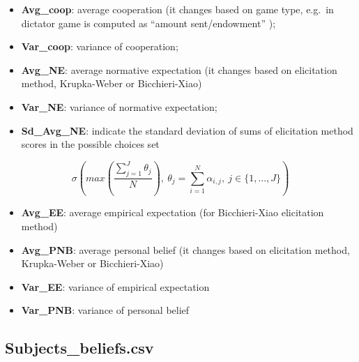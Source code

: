 \documentclass[
]{article}
\providecommand{\tightlist}{%
  \setlength{\itemsep}{0pt}\setlength{\parskip}{0pt}}
\begin{document}
\begin{itemize}
\tightlist
\item
  \textbf{Avg\_coop}: average cooperation (it changes based on game
  type, e.g.~in dictator game is computed as ``amount sent/endowment''
  );
\item
  \textbf{Var\_coop}: variance of cooperation;
\item
  \textbf{Avg\_NE}: average normative expectation (it changes based on
  elicitation method, Krupka-Weber or Bicchieri-Xiao)
\item
  \textbf{Var\_NE}: variance of normative expectation;
\item
  \textbf{Sd\_Avg\_NE}: indicate the standard deviation of sums of
  elicitation method scores in the possible choices set
\end{itemize}

\[\sigma\left(max\left( \frac{\sum_{j=1}^{J}\theta_j}{N} \right),\ \theta_j = \sum_{i=1}^{N}\alpha_{i,j}, \ j\in\{1,...,J\}\right)\]

\begin{itemize}
\tightlist
\item
  \textbf{Avg\_EE}: average empirical expectation (for Bicchieri-Xiao
  elicitation method)
\item
  \textbf{Avg\_PNB}: average personal belief (it changes based on
  elicitation method, Krupka-Weber or Bicchieri-Xiao)
\item
  \textbf{Var\_EE}: variance of empirical expectation
\item
  \textbf{Var\_PNB}: variance of personal belief
\end{itemize}

\hypertarget{beliefs}{%
\subsection{Subjects\_beliefs.csv}\label{beliefs}}
\end{document}
